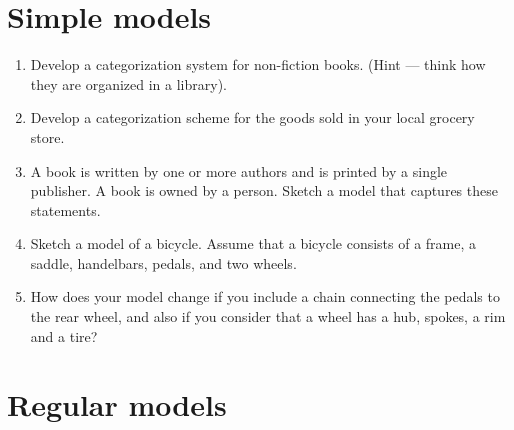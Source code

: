 \documentclass{article}
\newenvironment{exercises}{\begin{enumerate}}{\end{enumerate}}
\begin{document}
\clearpage
\section{Simple models}

\begin{exercises}

\item Develop a categorization system for non-fiction books. (Hint ---
      think how they are organized in a library).

\item Develop a categorization scheme for the goods sold in your local
      grocery store.

\item A book is written by one or more authors and is printed by a
      single publisher. A book is owned by a person. Sketch a model 
      that captures these statements.

\item Sketch a model of a bicycle. Assume that a bicycle consists of a frame,
      a saddle, handelbars, pedals, and two wheels.

\item How does your model change if you include a chain connecting the 
      pedals to the rear wheel, and also if you consider that a wheel has a 
      hub, spokes, a rim and a tire?


\end{exercises}

\clearpage
\section{Regular models}  \label{chap:regular}
\end{document}
